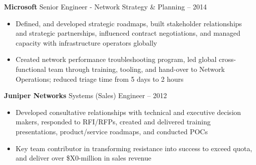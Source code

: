 \documentclass[11pt]{article}
\newcommand{\job}[3]{
    \begingroup
        \textbf{\small#1} \hfill \small#2 \--- \color{black!70}\small{#3}
    \endgroup
}
\newcommand{\spacevv}{
    \vspace{2mm}
}
\begin{document}
\begin{paracol}{2}
{    \job{Microsoft}{Senior Engineer \-- Network Strategy \& Planning}{2014\--2017}
    \begin{itemize}
        \item Defined, and developed strategic roadmaps, built stakeholder relationships and strategic
            partnerships, influenced contract negotiations, and managed capacity with infrastructure operators globally
        \item Created network performance troubleshooting program, led global cross-functional team through training,
            tooling, and hand-over to Network Operations; reduced triage time from 5 days to 2 hours
    \end{itemize}
    \spacevv{}

    \job{Juniper Networks}{Systems (Sales) Engineer}{2012}
    \begin{itemize}
        \item Developed consultative relationships with technical and executive decision makers, responded to RFI/RFPs,
            created and delivered training presentations, product/service roadmaps, and conducted POCs
        \item Key team contributor in transforming resistance into success to exceed quota, and deliver over
            \$X0-million in sales revenue
    \end{itemize}
    \spacevv{}

}
\end{paracol}
\end{document}
